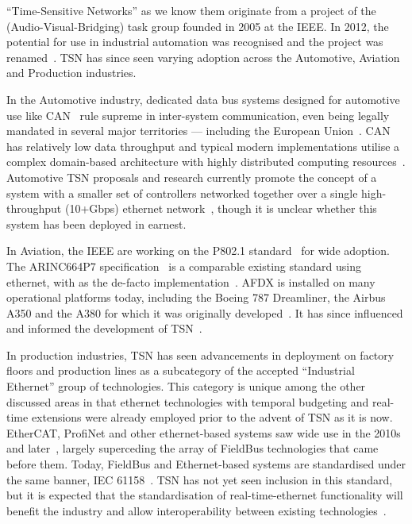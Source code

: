 ``Time-Sensitive Networks'' as we know them originate from a project of the  (Audio-Visual-Bridging) task group founded in 2005 at the IEEE.
In 2012, the potential for use in industrial automation was recognised and the project was renamed~\cite{imtiazProposalIntegrateProcess2011,zezulkaTimeSensitiveNetworkingCommunication2019}.
TSN has since seen varying adoption across the Automotive, Aviation and Production industries.

In the Automotive industry, dedicated data bus systems designed for automotive use like CAN~\cite{RoadVehiclesController2024} rule supreme in inter-system communication, even being legally mandated in several major territories --- including the European Union~\cite{RegulationECNo2007}.
CAN has relatively low data throughput and typical modern implementations utilise a complex domain-based architecture with highly distributed computing resources~\cite{ashjaeiTimeSensitiveNetworkingAutomotive2021a}.
Automotive TSN proposals and research currently promote the concept of a system with a smaller set of controllers networked together over a single high-throughput (10+Gbps) ethernet network~\cite{ashjaeiTimeSensitiveNetworkingAutomotive2021a,zinnerAutomotiveArchitectureEvolution2019}, though it is unclear whether this system has been deployed in earnest.

In Aviation, the IEEE are working on the P802.1 standard~\cite{P8021DPTSN2024} for wide adoption.
The ARINC664P7 specification~\cite{ARINC664P71AIRCRAFTDATA2009} is a comparable existing standard using ethernet, with  as the de-facto implementation~\cite{moreauxDataTransmissionSystem2005}.
AFDX is installed on many operational platforms today, including the Boeing 787 Dreamliner, the Airbus A350 and the A380 for which it was originally developed~\cite{AFDXTechnologyImprove2005,AirbusRockwellCollins13,itierA380IntegratedModular}.
It has since influenced and informed the development of TSN~\cite{pasquierAvionicsFullDuplex2015}.

In production industries, TSN has seen advancements in deployment on factory floors and production lines as a subcategory of the accepted ``Industrial Ethernet'' group of technologies.
This category is unique among the other discussed areas in that ethernet technologies with temporal budgeting and real-time extensions were already employed prior to the advent of TSN as it is now.
EtherCAT, ProfiNet and other ethernet-based systems saw wide use in the 2010s and later~\cite{linLookIndustrialEthernet2018}, largely superceding the array of FieldBus technologies that came before them.
Today, FieldBus and Ethernet-based systems are standardised under the same banner, IEC 61158~\cite{IEC611581Industrial2023}.
TSN has not yet seen inclusion in this standard, but it is expected that the standardisation of real-time-ethernet functionality will benefit the industry and allow interoperability between existing technologies~\cite{linLookIndustrialEthernet2018,sommerEthernetSurveyIts2010}.

